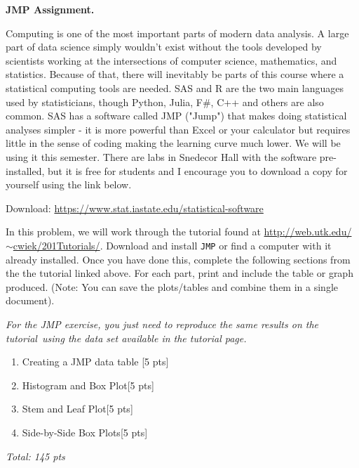 \documentclass[11pt]{article}\usepackage[]{graphicx}\usepackage[]{color}
\begin{document}

\item \textbf{JMP Assignment.} 

   Computing is one of the most important parts of modern data analysis. A large part of data science simply wouldn't exist without the tools developed by scientists working at the intersections of computer science, mathematics, and statistics. 
   Because of that, there will inevitably be parts of this course where a statistical computing tools are needed. SAS and R are the two main languages used by statisticians, though Python, Julia, F\#, C++ and others are also common.
   SAS has a software called JMP ("Jump") that makes doing statistical analyses simpler - it is more powerful than Excel or your calculator but requires little in the sense of coding making the learning curve much lower. 
   We will be using it this semester. There are labs in Snedecor Hall with the software pre-installed, but it is free for students and I encourage you to download a copy for yourself using the link below.

   Download: \href{https://www.stat.iastate.edu/statistical-software}{https://www.stat.iastate.edu/statistical-software}

   In this problem, we will work through the tutorial found at \href{http://web.utk.edu/~cwiek/201Tutorials/}{http://web.utk.edu/$\sim$cwiek/201Tutorials/}. Download and install \texttt{JMP} or find a computer with it already installed. Once you have done this, complete the following sections from the the tutorial linked above. For each part, print and include the table or graph produced. (Note: You can save the plots/tables and combine them in a single document).

\emph{For the JMP exercise, you just need to reproduce the same results on the tutorial using the data set available in the tutorial page.}
   \begin{enumerate}
      \item Creating a JMP data table [5 pts]
      \item Histogram and Box Plot[5 pts]
      \item Stem and Leaf Plot[5 pts]
      \item Side-by-Side Box Plots[5 pts]
   \end{enumerate}



\emph{Total: 145 pts}
\end{document}
